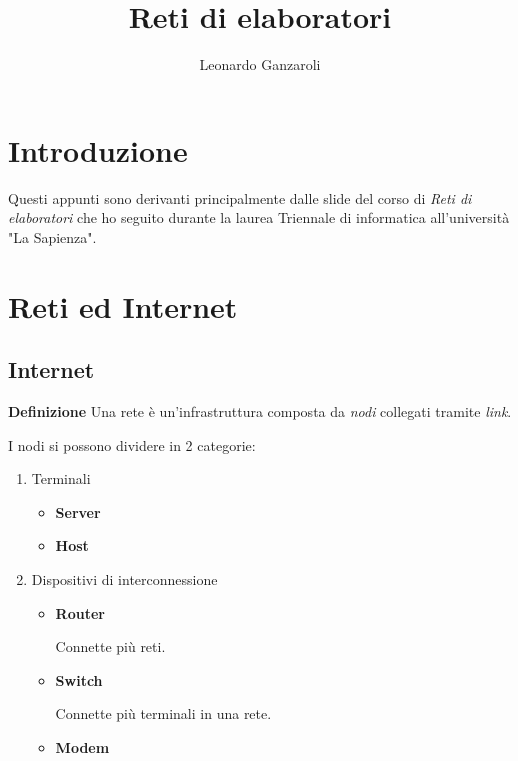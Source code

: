 \documentclass{article}
\title{Reti di elaboratori}
\author{Leonardo Ganzaroli}
\date{}
\begin{document}
\maketitle


\tableofcontents

\hypersetup{allcolors=black}

\newpage

\section*{Introduzione}

Questi appunti sono derivanti principalmente dalle slide del corso di \textit{Reti di elaboratori} che ho seguito durante la laurea Triennale di informatica all'università "La Sapienza".

\newpage

\section{Reti ed Internet}

\subsection{Internet}

\textbf{Definizione} Una rete è un'infrastruttura composta da \textit{nodi} collegati tramite \textit{link}.\newline

\noindent I nodi si possono dividere in 2 categorie:
\begin{enumerate}
    \item Terminali
        \begin{itemize}
            \item \textbf{Server}
            \item \textbf{Host}
        \end{itemize}
    \item Dispositivi di interconnessione
        \begin{itemize}
            \item \textbf{Router}

                Connette più reti.
            
            \item \textbf{Switch}

                Connette più terminali in una rete.
            
            \item \textbf{Modem}\newline
        \end{itemize}
\end{enumerate}
\end{document}
